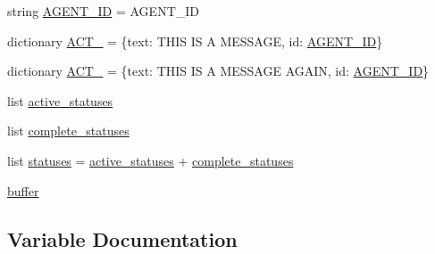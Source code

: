 \begin{DoxyCompactItemize}
\item 
string \hyperlink{namespaceparlai_1_1mturk_1_1core_1_1test_1_1test__mturk__agent_a489ef5ef0bbfe82ff387fa95b65924f3}{A\+G\+E\+N\+T\+\_\+\+ID} = \textquotesingle{}A\+G\+E\+N\+T\+\_\+\+ID\textquotesingle{}
\item 
dictionary \hyperlink{namespaceparlai_1_1mturk_1_1core_1_1test_1_1test__mturk__agent_a13fa25fb6127352417223d7d58ba3a89}{A\+C\+T\+\_} = \{\textquotesingle{}text\textquotesingle{}\+: \textquotesingle{}T\+H\+IS IS A M\+E\+S\+S\+A\+GE\textquotesingle{}, \textquotesingle{}id\textquotesingle{}\+: \hyperlink{namespaceparlai_1_1mturk_1_1core_1_1test_1_1test__mturk__agent_a489ef5ef0bbfe82ff387fa95b65924f3}{A\+G\+E\+N\+T\+\_\+\+ID}\}
\item 
dictionary \hyperlink{namespaceparlai_1_1mturk_1_1core_1_1test_1_1test__mturk__agent_a2c48ecd5941f266636ada11bdb139ff7}{A\+C\+T\+\_} = \{\textquotesingle{}text\textquotesingle{}\+: \textquotesingle{}T\+H\+IS IS A M\+E\+S\+S\+A\+GE A\+G\+A\+IN\textquotesingle{}, \textquotesingle{}id\textquotesingle{}\+: \hyperlink{namespaceparlai_1_1mturk_1_1core_1_1test_1_1test__mturk__agent_a489ef5ef0bbfe82ff387fa95b65924f3}{A\+G\+E\+N\+T\+\_\+\+ID}\}
\item 
list \hyperlink{namespaceparlai_1_1mturk_1_1core_1_1test_1_1test__mturk__agent_a561ac591d4863fdea2b5ea327d606437}{active\+\_\+statuses}
\item 
list \hyperlink{namespaceparlai_1_1mturk_1_1core_1_1test_1_1test__mturk__agent_a6bf31224e100d7f04f59a4fd8dcff530}{complete\+\_\+statuses}
\item 
list \hyperlink{namespaceparlai_1_1mturk_1_1core_1_1test_1_1test__mturk__agent_a037cdd8b1b5e261b49ff67f7651bb3da}{statuses} = \hyperlink{namespaceparlai_1_1mturk_1_1core_1_1test_1_1test__mturk__agent_a561ac591d4863fdea2b5ea327d606437}{active\+\_\+statuses} + \hyperlink{namespaceparlai_1_1mturk_1_1core_1_1test_1_1test__mturk__agent_a6bf31224e100d7f04f59a4fd8dcff530}{complete\+\_\+statuses}
\item 
\hyperlink{namespaceparlai_1_1mturk_1_1core_1_1test_1_1test__mturk__agent_ab6a0856c3ddfde31dd9883b16b1df25f}{buffer}
\end{DoxyCompactItemize}


\subsection{Variable Documentation}
\mbox{\label{namespaceparlai_1_1mturk_1_1core_1_1test_1_1test__mturk__agent_a13fa25fb6127352417223d7d58ba3a89}} 
